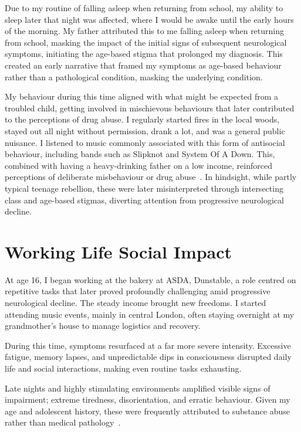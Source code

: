 \documentclass{article}
\begin{document}
Due to my routine of falling asleep when returning from school, my ability to sleep later that night was affected, where I would be awake until the early hours of the morning. My father attributed this to me falling asleep when returning from school, masking the impact of the initial signs of subsequent neurological symptoms, initiating the age-based stigma that prolonged my diagnosis. This created an early narrative that framed my symptoms as age-based behaviour rather than a pathological condition, masking the underlying condition.

My behaviour during this time aligned with what might be expected from a troubled child, getting involved in mischievous behaviours that later contributed to the perceptions of drug abuse. I regularly started fires in the local woods, stayed out all night without permission, drank a lot, and was a general public nuisance. I listened to music commonly associated with this form of antisocial behaviour, including bands such as Slipknot and System Of A Down. This, combined with having a heavy-drinking father on a low income, reinforced perceptions of deliberate misbehaviour or drug abuse~\cite{childrens2017}. In hindsight, while partly typical teenage rebellion, these were later misinterpreted through intersecting class and age-based stigmas, diverting attention from progressive neurological decline.

\section*{Working Life Social Impact}
At age 16, I began working at the bakery at ASDA, Dunstable, a role centred on repetitive tasks that later proved profoundly challenging amid progressive neurological decline. The steady income brought new freedoms. I started attending music events, mainly in central London, often staying overnight at my grandmother’s house to manage logistics and recovery.

During this time, symptoms resurfaced at a far more severe intensity. Excessive fatigue, memory lapses, and unpredictable dips in consciousness disrupted daily life and social interactions, making even routine tasks exhausting.

Late nights and highly stimulating environments amplified visible signs of impairment; extreme tiredness, disorientation, and erratic behaviour. Given my age and adolescent history, these were frequently attributed to substance abuse rather than medical pathology~\cite{yang2017,hammarlund2018,zwick2020,lankenau2012}.
\end{document}
